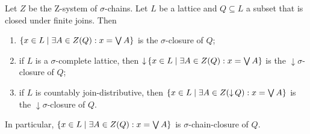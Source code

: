 \begin{proposition} \label{sigmaClosureOfSubjoinSemilattice}
Let $Z$ be the $\mathrm{Z}$-system of $\sigma$-chains. Let $L$ be a lattice and $Q\subseteq L$ a subset that is closed under finite joins. Then
\begin{enumerate}
\item $\setbuilder{x\in L}{\exists A\in Z(Q): x = \bigvee A}$ is the $\sigma$-closure of $Q$;
\item if $L$ is a $\sigma$-complete lattice, then $\downset \setbuilder{x\in L}{\exists A\in Z(Q): x = \bigvee A}$ is the $\downarrow \sigma$-closure of $Q$;
\item if $L$ is countably join-distributive, then $\setbuilder{x\in L}{\exists A\in Z(\downset Q): x = \bigvee A}$ is the $\downarrow \sigma$-closure of $Q$.
\end{enumerate}
\end{proposition}
In particular, $\setbuilder{x\in L}{\exists A\in Z(Q): x = \bigvee A}$ is $\sigma$-chain-closure of $Q$.
